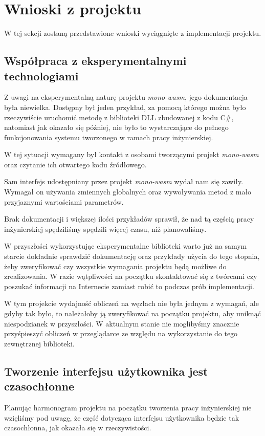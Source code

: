 \documentclass[a4paper,11pt,twoside]{report}
\theoremstyle{definition}
\begin{document}
    \section{Wnioski z projektu}
        W tej sekcji zostaną przedstawione wnioski wyciągnięte z implementacji projektu.
        
        \subsection{Współpraca z eksperymentalnymi technologiami}
            Z uwagi na eksperymentalną naturę projektu \textit{mono-wasm}, jego dokumentacja była niewielka. Dostępny był jeden przykład, za pomocą którego można było rzeczywiście uruchomić metodę z biblioteki DLL zbudowanej z kodu C\#, natomiast jak okazało się później, nie było to wystarczające do pełnego funkcjonowania systemu tworzonego w ramach pracy inżynierskiej.
            
            W tej sytuacji wymagany był kontakt z osobami tworzącymi projekt \textit{mono-wasm} oraz czytanie ich otwartego kodu źródłowego.
            
            Sam interfejs udostępniany przez projekt \textit{mono-wasm} wydał nam się zawiły. Wymagał on używania zmiennych globalnych oraz wywoływania metod z mało przyjaznymi wartościami parametrów.
            
            Brak dokumentacji i większej ilości przykładów sprawił, że nad tą częścią pracy inżynierskiej spędziliśmy spędzili więcej czasu, niż planowaliśmy.
            
            W przyszłości wykorzystując eksperymentalne biblioteki warto już na samym starcie dokładnie sprawdzić dokumentację oraz przykłady użycia do tego stopnia, żeby zweryfikować czy wszystkie wymagania projektu będą możliwe do zrealizowania. W razie wątpliwości na początku skontaktować się z twórcami czy poszukać informacji na Internecie zamiast robić to podczas prób implementacji.
            
            W tym projekcie wydajność obliczeń na węzłach nie była jednym z wymagań, ale gdyby tak było, to należałoby ją zweryfikować na początku projektu, aby uniknąć niespodzianek w przyszłości. W aktualnym stanie nie moglibyśmy znacznie przyśpieszyć obliczeń w przeglądarce ze względu na wykorzystanie do tego zewnętrznej biblioteki.
        
        \subsection{Tworzenie interfejsu użytkownika jest czasochłonne}
            Planując harmonogram projektu na początku tworzenia pracy inżynierskiej nie wzięliśmy pod uwagę, że część dotycząca interfejsu użytkownika będzie tak czasochłonna, jak okazała się w rzeczywistości.
            
\end{document}
